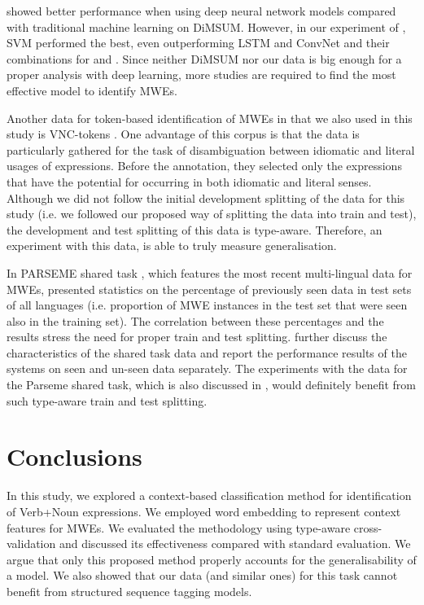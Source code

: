 \documentclass[output=paper
,modfonts
,nonflat]{langsci/langscibook}
\begin{document}
\cite{Gharbieh2017} showed better performance when using deep neural network models compared with traditional machine learning on DiMSUM. However, in our experiment of , SVM performed the best, even outperforming LSTM and ConvNet and their combinations for  and .
Since neither DiMSUM nor our data is big enough for a proper analysis with deep learning, more studies are required to find the most effective model to identify MWEs.

Another data for token-based identification of MWEs in  that we also used in this study is VNC-tokens \citep{cook2008vnc}. One advantage of this corpus is that the data is particularly gathered for the task of disambiguation between idiomatic and literal usages of expressions. Before the annotation, they selected only the expressions that have the potential for occurring in both idiomatic and literal senses. 
Although we did not follow the initial development splitting of the data for this study (i.e. we followed our proposed way of splitting the data into train and test),
the development and test splitting of this data is type-aware. Therefore, an experiment with this data, is able to truly measure generalisation. %

In PARSEME shared task \citep{MWEWorkshop}, which features the most recent multi-lingual data for MWEs, \cite{maldonado2017} presented statistics on the percentage of previously seen data in test sets of all languages (i.e. proportion of MWE instances in the test set that were seen also in the training set). The correlation between these percentages and the results stress the need for proper train and test splitting.   further discuss the characteristics of the shared task data and report the performance results of the systems on seen and un-seen data separately.  
The experiments with the data for the Parseme shared task, which is also discussed in , would definitely benefit from such type-aware train and test splitting.

\section{Conclusions}
In this study, we explored a context-based classification method for identification of Verb+Noun expressions. We employed word embedding to represent context features for MWEs. We evaluated the methodology using type-aware cross-validation and discussed its effectiveness compared with standard evaluation. We argue that only this proposed method properly accounts for the generalisability of a model. We also showed that our data (and similar ones) for this task cannot benefit from structured sequence tagging models.
\end{document}
